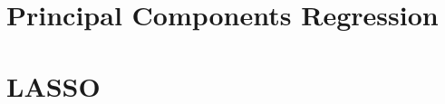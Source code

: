 \documentclass[12pt]{article}
\theoremstyle{definition}
\begin{document}
\section{Principal Components Regression}

\section{LASSO}
\end{document}
